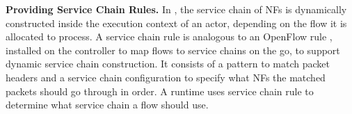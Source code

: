   
\textbf{Providing Service Chain Rules.} %
 In \nfactor, the service chain of NFs is dynamically constructed inside the execution context of an actor, depending on the flow it is allocated to process. %
 A service chain rule is analogous to an OpenFlow rule \cite{mckeown2008openflow}, installed on the controller to map flows to service chains on the go, to support dynamic service chain construction. It consists of a pattern to match packet headers and a
service chain configuration to specify what NFs the matched packets should go
through in order. A runtime uses service chain rule to determine what service chain
a flow should use. 

